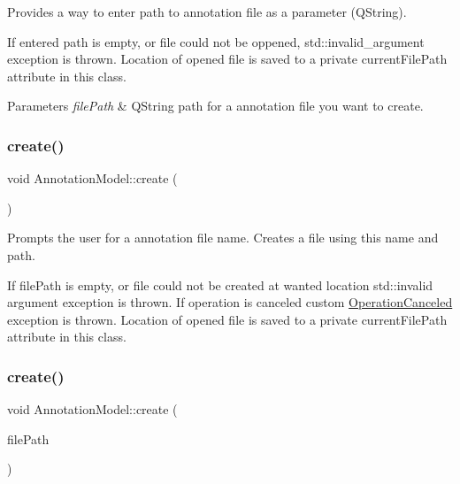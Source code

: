 Provides a way to enter path to annotation file as a parameter (Q\+String). 

If entered path is empty, or file could not be oppened, std\+::invalid\+\_\+argument exception is thrown. Location of opened file is saved to a private current\+File\+Path attribute in this class.


\begin{DoxyParams}{Parameters}
{\em file\+Path} & Q\+String path for a annotation file you want to create. \\
\hline
\end{DoxyParams}
\mbox{\label{classAnnotationModel_ac4c6850c8d0f704c3bf5bef486992690}} 
\subsubsection{\texorpdfstring{create()}{create()}\hspace{0.1cm}{\footnotesize\ttfamily [1/2]}}
{\footnotesize\ttfamily void Annotation\+Model\+::create (\begin{DoxyParamCaption}{ }\end{DoxyParamCaption})}



Prompts the user for a annotation file name. Creates a file using this name and path. 

If file\+Path is empty, or file could not be created at wanted location std\+::invalid argument exception is thrown. If operation is canceled custom \hyperlink{classOperationCanceled}{Operation\+Canceled} exception is thrown. Location of opened file is saved to a private current\+File\+Path attribute in this class. \mbox{\label{classAnnotationModel_ac5062c8663670a312132929f16e4be64}} 
\subsubsection{\texorpdfstring{create()}{create()}\hspace{0.1cm}{\footnotesize\ttfamily [2/2]}}
{\footnotesize\ttfamily void Annotation\+Model\+::create (\begin{DoxyParamCaption}\item[{const Q\+String \&}]{file\+Path }\end{DoxyParamCaption})}



